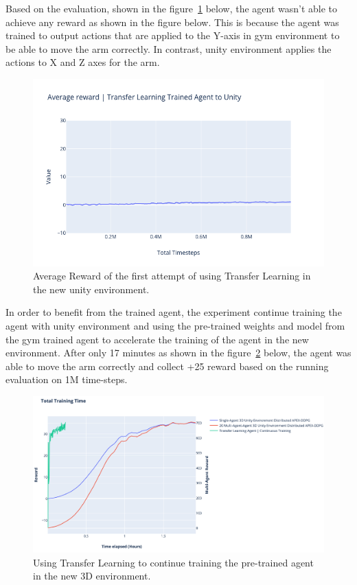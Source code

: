 Based on the evaluation, shown in the figure~\ref{fig:4th_exp_1st_transfer_learning} below, the agent wasn't able to achieve any reward as shown in the figure below. This is because the agent was trained to output actions that are applied to the Y-axis in gym environment to be able to move the arm correctly. In contrast, unity environment applies the actions to X and Z axes for the arm.
\begin{figure}[!htb]
		\centering
		\includegraphics[width=\linewidth]{figures/exps/4th_exp/1st_transfer_learning.png}
		\caption{Average Reward of the first attempt of using Transfer Learning in the new unity environment.}
		\label{fig:4th_exp_1st_transfer_learning}
\end{figure}

In order to benefit from the trained agent, the experiment continue training the agent with unity environment and using the pre-trained weights and model from the gym trained agent to accelerate the training of the agent in the new environment. After only 17 minutes as shown in the figure~\ref{fig:4th_exp_2nd_transfer_learning} below, the agent was able to move the arm correctly and collect +25 reward based on the running evaluation on 1M time-steps.
\begin{figure}[!htb]
		\centering
		\includegraphics[width=\linewidth]{figures/exps/4th_exp/2nd_transfer_learning.png}
		\caption{Using Transfer Learning to continue training the pre-trained agent in the new 3D environment.}
		\label{fig:4th_exp_2nd_transfer_learning}
\end{figure}



